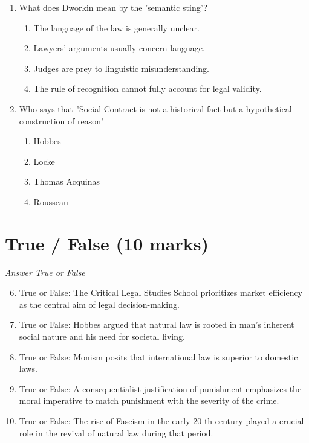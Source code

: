 \documentclass[12pt]{article}
\begin{document}
\begin{enumerate}[label=\arabic*.]
\item What does Dworkin mean by the 'semantic sting'?
\begin{enumerate}[label=(\alph*)]
    \item The language of the law is generally unclear.
    \item Lawyers' arguments usually concern language.
    \item Judges are prey to linguistic misunderstanding.
    \item The rule of recognition cannot fully account for legal validity.
\end{enumerate}
\item Who says that "Social Contract is not a historical fact but a hypothetical construction of reason"
\begin{enumerate}[label=(\alph*)]
    \item Hobbes
    \item Locke
    \item Thomas Acquinas
    \item Rousseau
\end{enumerate}
\end{enumerate}

\section*{True / False (10 marks)}
\textit{Answer True or False}
\begin{enumerate}[label=\arabic*.]
\setcounter{enumi}{5}
\item True or False: The Critical Legal Studies School prioritizes market efficiency as the central aim of legal decision-making.
\item True or False: Hobbes argued that natural law is rooted in man's inherent social nature and his need for societal living.
\item True or False: Monism posits that international law is superior to domestic laws.
\item True or False: A consequentialist justification of punishment emphasizes the moral imperative to match punishment with the severity of the crime.
\item True or False: The rise of Fascism in the early 20 th century played a crucial role in the revival of natural law during that period.
\end{enumerate}
\end{document}
